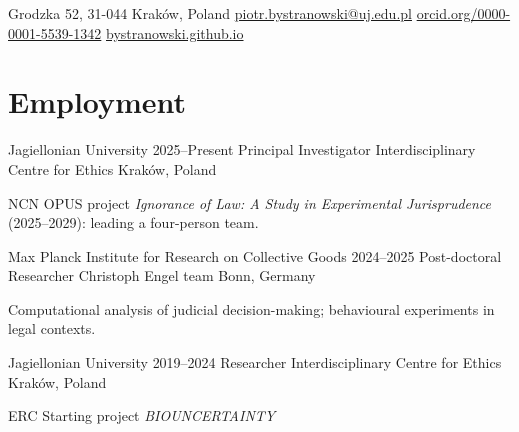 \documentclass{resume}
\begin{document}
\begin{center}
  \contact
    {Grodzka 52, 31-044 Kraków, Poland}
    {\href{mailto:piotr.bystranowski@uj.edu.pl}{piotr.bystranowski@uj.edu.pl}}
    {\href{https://orcid.org/0000-0001-5539-1342}{orcid.org/0000-0001-5539-1342}}
    {\href{https://bystranowski.github.io}{bystranowski.github.io}}
\end{center}

\section{Employment}
\begin{content}

\newcommand{\wrap}[1]{\parbox[t]{0.85\linewidth}{#1}}

\begin{position}
  {Jagiellonian University}
  {2025--Present}
  {Principal Investigator}
  {Interdisciplinary Centre for Ethics}
  {Kraków, Poland}
    \item \wrap{NCN OPUS project \textit{Ignorance of Law: A Study in Experimental Jurisprudence}
          (2025–2029): leading a four-person team.}
\end{position}


  \begin{position}
    {Max Planck Institute for Research on Collective Goods}
    {2024--2025}
    {Post-doctoral Researcher}
    {Christoph Engel team}
    {Bonn, Germany}
    \item Computational analysis of judicial decision-making; behavioural experiments in legal contexts.
  \end{position}

  \begin{position}
    {Jagiellonian University}
    {2019--2024}
    {Researcher}
    {Interdisciplinary Centre for Ethics}
    {Kraków, Poland}
    \item ERC Starting project \textit{BIOUNCERTAINTY}
  \end{position}

\sectionlineskip
\end{content}
\end{document}
